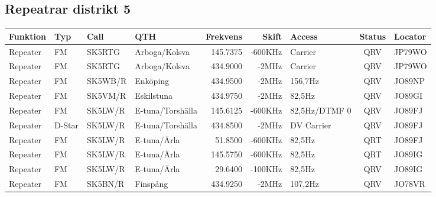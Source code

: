 \begin{landscape}
\subsection{Repeatrar distrikt 5}
\begin{longtable}{llllrrlcl}
	\textbf{Funktion}         & \textbf{Typ}  & \textbf{Call} & \textbf{QTH}        & \textbf{Frekvens} & \textbf{Skift} & \textbf{Access}  & \textbf{Status} & \textbf{Locator} \\ \hline
	\endhead
	Repeater                  & FM            & SK5RTG        & Arboga/Kolsva       & 145.7375          & -600KHz        & Carrier          & QRV             & JP79WO           \\
	Repeater                  & FM            & SK5RTG        & Arboga/Kolsva       & 434.9000          & -2MHz          & Carrier          & QRV             & JP79WO           \\
	Repeater                  & FM            & SK5WB/R       & Enköping            & 434.9500          & -2MHz          & 156,7Hz          & QRV             & JO89NP           \\
	Repeater                  & FM            & SK5VM/R       & Eskilstuna          & 434.9750          & -2MHz          & 82,5Hz           & QRV             & JO89GI           \\
	Repeater                  & FM            & SK5LW/R       & E-tuna/Torshälla    & 145.6125          & -600KHz        & 82,5Hz/DTMF 0    & QRV             & JO89FJ           \\
	Repeater                  & D-Star        & SK5LW/R       & E-tuna/Torshälla    & 434.8500          & -2MHz          & DV Carrier       & QRV             & JO89FJ           \\
	Repeater                  & FM            & SK5LW/R       & E-tuna/Ärla         & 51.8500           & -600KHz        & 82,5Hz           & QRT             & JO89FJ           \\
	Repeater                  & FM            & SK5LW/R       & E-tuna/Ärla         & 145.5750          & -600KHz        & 82,5Hz           & QRT             & JO89IG           \\
	Repeater                  & FM            & SK5LW/R       & E-tuna/Ärla         & 29.6400           & -100KHz        & 82,5Hz           & QRV             & JO89IG           \\
	Repeater                  & FM            & SK5BN/R       & Finspång            & 434.9250          & -2MHz          & 107,2Hz          & QRV             & JO78VR           \\

\end{longtable}
\end{landscape}
